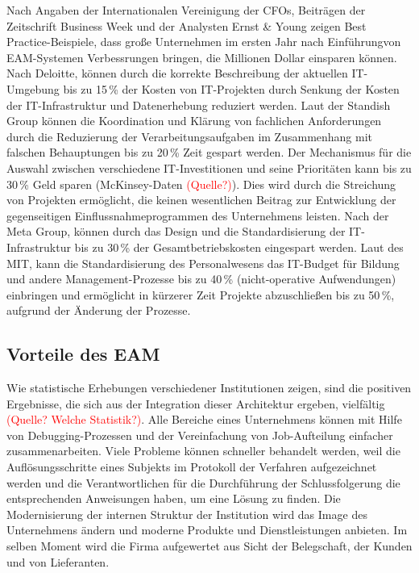 \documentclass[
	doc,
	a4paper,
	helv
	]{apa6}
\begin{document}
Nach Angaben der Internationalen Vereinigung der CFOs, Beiträgen der Zeitschrift Business Week und der Analysten Ernst \& Young zeigen Best Practice-Beispiele, dass große Unternehmen im ersten Jahr nach Einführungvon EAM-Systemen Verbessrungen bringen, die Millionen Dollar einsparen können.
Nach Deloitte, können durch die  korrekte Beschreibung der aktuellen IT-Umgebung bis zu 15\,\% der Kosten von IT-Projekten durch Senkung der Kosten der IT-Infrastruktur und Datenerhebung reduziert werden. Laut der Standish Group können die Koordination und Klärung von fachlichen Anforderungen durch die Reduzierung der Verarbeitungsaufgaben im Zusammenhang mit falschen Behauptungen bis zu 20\,\%  Zeit gespart werden. Der Mechanismus für die Auswahl zwischen verschiedene  IT-Investitionen und seine  Prioritäten  kann bis zu 30\,\% Geld sparen (McKinsey-Daten \textcolor{red}{(Quelle?)}). Dies wird durch die Streichung von Projekten ermöglicht, die keinen wesentlichen Beitrag zur Entwicklung der gegenseitigen Einflussnahmeprogrammen des Unternehmens leisten. Nach der Meta Group, können durch das Design und die Standardisierung der IT-Infrastruktur bis zu 30\,\% der Gesamtbetriebskosten eingespart werden. Laut des MIT, kann die Standardisierung des Personalwesens das IT-Budget für Bildung und andere Management-Prozesse bis zu 40\,\% (nicht-operative Aufwendungen) einbringen und ermöglicht  in kürzerer Zeit Projekte abzuschließen bis zu 50\,\%, aufgrund der Änderung der Prozesse.
\subsection{Vorteile des EAM}
Wie statistische Erhebungen verschiedener Institutionen zeigen, sind die positiven Ergebnisse, die sich aus der Integration dieser Architektur ergeben, vielfältig \textcolor{red}{(Quelle? Welche Statistik?)}. Alle Bereiche eines Unternehmens können mit Hilfe von Debugging-Prozessen und der Vereinfachung von Job-Aufteilung einfacher zusammenarbeiten. Viele Probleme können schneller behandelt werden, weil die Auflösungsschritte eines Subjekts im Protokoll der Verfahren aufgezeichnet werden und die Verantwortlichen für die Durchführung der Schlussfolgerung die entsprechenden Anweisungen haben, um eine Lösung zu finden. Die Modernisierung der internen Struktur der Institution wird das Image des Unternehmens ändern und moderne Produkte und Dienstleistungen anbieten. Im selben Moment wird die Firma aufgewertet aus Sicht der Belegschaft, der Kunden und von Lieferanten.
\end{document}
